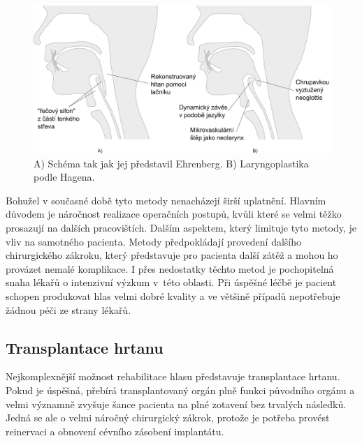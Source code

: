 \begin{figure}[htb]
  \begin{center}
    \includegraphics[width=0.9\linewidth]{ch3-cause/figures/microvascular}
    \caption[Schéma  a laryngoplastiky.]{A) Schéma  tak jak jej představil Ehrenberg. B) Laryngoplastika podle Hagena.}
    \label{fig:cause:treatment:microvascular}
  \end{center}
\end{figure}

Bohužel v současné době tyto metody nenacházejí širší uplatnění. Hlavním důvodem je
náročnost realizace operačních postupů, kvůli které se velmi
těžko prosazují na dalších pracovištích. Dalším aspektem, který limituje tyto
metody, je vliv na samotného pacienta. Metody předpokládají provedení dalšího chirurgického
zákroku, který představuje pro pacienta další zátěž a mohou ho provázet nemalé komplikace. 
I přes nedostatky těchto metod je
pochopitelná snaha lékařů o intenzivní výzkum v~této oblasti. Při úspěšné
léčbě je pacient schopen produkovat hlas velmi dobré kvality a ve většině
případů nepotřebuje žádnou péči ze strany lékařů.


\subsection{Transplantace hrtanu}
\label{chap:cause:treatment:transplantation}

Nejkomplexnější možnost rehabilitace hlasu představuje transplantace hrtanu.
Pokud je úspěšná, přebírá transplantovaný orgán plně funkci původního
orgánu a velmi významně zvyšuje šance pacienta na plné zotavení bez trvalých
následků. Jedná se ale o velmi náročný chirurgický zákrok, protože je potřeba provést reinervaci a obnovení cévního zásobení implantátu.

